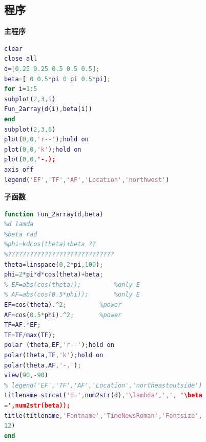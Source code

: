\subsection{程序}
\noindent \textbf{主程序}
\begin{lstlisting}[language={matlab},keywordstyle=\color{blue!70},commentstyle=\color{red!50!green!50!blue!50},frame=shadowbox, rulesepcolor=\color{red!20!green!20!blue!20}] 
clear
close all
d=[0.25 0.25 0.5 0.5 0.5];
beta=[ 0 0.5*pi 0 pi 0.5*pi];
for i=1:5
subplot(2,3,i)
Fun_2array(d(i),beta(i))
end
subplot(2,3,6)
plot(0,0,'r--');hold on
plot(0,0,'k');hold on
plot(0,0,'-.);
axis off
legend('EF','TF','AF','Location','northwest')
\end{lstlisting}
\noindent \textbf{子函数}
\begin{lstlisting}[language={matlab},keywordstyle=\color{blue!70},commentstyle=\color{red!50!green!50!blue!50},frame=shadowbox, rulesepcolor=\color{red!20!green!20!blue!20}] 
function Fun_2array(d,beta)
%d lamda
%beta rad
%phi=kdcos(theta)+beta ??
%?????????????????????????????
theta=linspace(0,2*pi,100);
phi=2*pi*d*cos(theta)+beta;
% EF=abs(cos(theta));         %only E
% AF=abs(cos(0.5*phi));       %only E
EF=cos(theta).^2;         %power
AF=cos(0.5*phi).^2;       %power
TF=AF.*EF;
TF=TF/max(TF);
polar (theta,EF,'r--');hold on
polar(theta,TF,'k');hold on
polar(theta,AF,'-.');
view(90,-90)
% legend('EF','TF','AF','Location','northeastoutside')
titlename=strcat('d=',num2str(d),'\lambda',',', '\beta
=',num2str(beta));
title(titlename,'Fontname','TimeNewsRoman','Fontsize',
12)
end
\end{lstlisting}